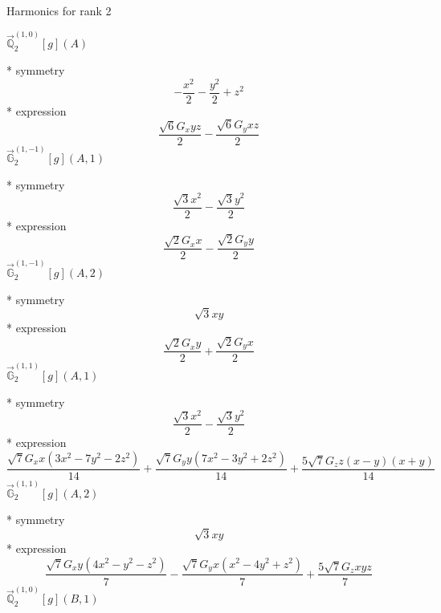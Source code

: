 \documentclass[fleqn,8pt]{jsarticle}
\begin{document}
\noindent * Harmonics for rank 2

\noindent\quad $\vec{\mathbb{Q}}_{2}^{(1,0)}[g](A)$

\noindent\quad ** symmetry
\begin{dmath*}
- \frac{x^{2}}{2} - \frac{y^{2}}{2} + z^{2}
\end{dmath*}
\noindent\quad ** expression
\begin{dmath*}
\frac{\sqrt{6} G_{x} y z}{2} - \frac{\sqrt{6} G_{y} x z}{2}
\end{dmath*}
\noindent\quad $\vec{\mathbb{G}}_{2}^{(1,-1)}[g](A,1)$

\noindent\quad ** symmetry
\begin{dmath*}
\frac{\sqrt{3} x^{2}}{2} - \frac{\sqrt{3} y^{2}}{2}
\end{dmath*}
\noindent\quad ** expression
\begin{dmath*}
\frac{\sqrt{2} G_{x} x}{2} - \frac{\sqrt{2} G_{y} y}{2}
\end{dmath*}
\noindent\quad $\vec{\mathbb{G}}_{2}^{(1,-1)}[g](A,2)$

\noindent\quad ** symmetry
\begin{dmath*}
\sqrt{3} x y
\end{dmath*}
\noindent\quad ** expression
\begin{dmath*}
\frac{\sqrt{2} G_{x} y}{2} + \frac{\sqrt{2} G_{y} x}{2}
\end{dmath*}
\noindent\quad $\vec{\mathbb{G}}_{2}^{(1,1)}[g](A,1)$

\noindent\quad ** symmetry
\begin{dmath*}
\frac{\sqrt{3} x^{2}}{2} - \frac{\sqrt{3} y^{2}}{2}
\end{dmath*}
\noindent\quad ** expression
\begin{dmath*}
\frac{\sqrt{7} G_{x} x \left(3 x^{2} - 7 y^{2} - 2 z^{2}\right)}{14} + \frac{\sqrt{7} G_{y} y \left(7 x^{2} - 3 y^{2} + 2 z^{2}\right)}{14} + \frac{5 \sqrt{7} G_{z} z \left(x - y\right) \left(x + y\right)}{14}
\end{dmath*}
\noindent\quad $\vec{\mathbb{G}}_{2}^{(1,1)}[g](A,2)$

\noindent\quad ** symmetry
\begin{dmath*}
\sqrt{3} x y
\end{dmath*}
\noindent\quad ** expression
\begin{dmath*}
\frac{\sqrt{7} G_{x} y \left(4 x^{2} - y^{2} - z^{2}\right)}{7} - \frac{\sqrt{7} G_{y} x \left(x^{2} - 4 y^{2} + z^{2}\right)}{7} + \frac{5 \sqrt{7} G_{z} x y z}{7}
\end{dmath*}
\noindent\quad $\vec{\mathbb{Q}}_{2}^{(1,0)}[g](B,1)$
\end{document}
